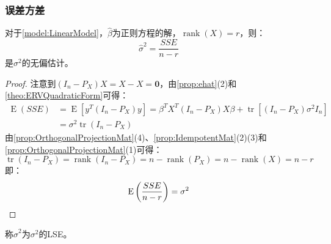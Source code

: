 \subsubsection{误差方差}
\begin{theorem}\label{theo:VarianceOfErrorTerm}
	对于\cref{model:LinearModel}，$\hat{\beta}$为正则方程的解，$\operatorname{rank}(X)=r$，则：
	\begin{equation*}
		\hat{\sigma}^2=\frac{SSE}{n-r}
	\end{equation*}
	是$\sigma^2$的无偏估计。
\end{theorem}
\begin{proof}
注意到$(I_n-P_X)X=X-X=\mathbf{0}$，由\cref{prop:ehat}(2)和\cref{theo:ERVQuadraticForm}可得：
	\begin{align*}
		\operatorname{E}(SSE)&=\operatorname{E}[y^T(I_n-P_X)y] =\beta^TX^T(I_n-P_X)X\beta+\operatorname{tr}[(I_n-P_X)\sigma^2I_n] \\
		&=\sigma^2\operatorname{tr}(I_n-P_X)
	\end{align*}
	由\cref{prop:OrthogonalProjectionMat}(4)、\cref{prop:IdempotentMat}(2)(3)和\cref{prop:OrthogonalProjectionMat}(1)可得：
	\begin{equation*}
		\operatorname{tr}(I_n-P_X)=\operatorname{rank}(I_n-P_X)=n-\operatorname{rank}(P_X)=n-\operatorname{rank}(X)=n-r
	\end{equation*}
	即：
	\begin{equation*}
		\operatorname{E}\left(\frac{SSE}{n-r}\right)=\sigma^2\qedhere
	\end{equation*}
\end{proof}
\begin{definition}
	称$\hat{\sigma}^2$为$\sigma^2$的LSE。
\end{definition}

